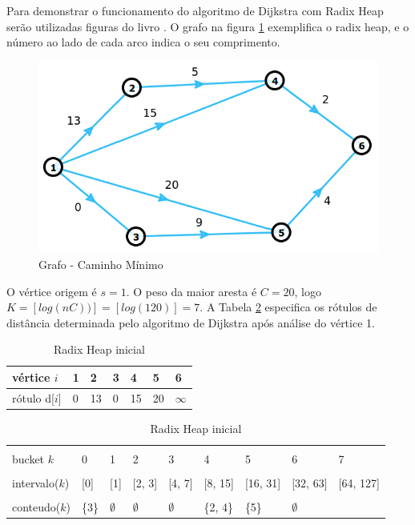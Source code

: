 Para demonstrar o funcionamento do algoritmo de Dijkstra com Radix Heap serão utilizadas figuras do livro \cite{bookahuja}.
O grafo na figura \ref{fig:grafoRadix} exemplifica o radix heap, e o número ao lado de cada arco indica o seu comprimento.
\FloatBarrier
\begin{figure}[htbp]
\centering
 \includegraphics[width=.65\textwidth]{figuras/grafoRadix.png}
\caption{Grafo - Caminho Mínimo}
\label{fig:grafoRadix}
\end{figure}
\FloatBarrier
O vértice origem é $s = 1$. O peso da maior aresta é $C = 20$, logo $K = [log(nC))] = [log(120)] = 7$.
A Tabela \ref{tab:initialradixheap} especifica os rótulos de distância determinada pelo algoritmo de Dijkstra
após análise do vértice 1.
\FloatBarrier
\begin{table}[htbp]
  \centering
  \begin{tabular}{l l l l l l l}
  \toprule
  vértice $i$ & 1 & 2 & 3 & 4 & 5 & 6\\
  \midrule
  rótulo d[$i$] & 0 & 13 & 0 & 15 & 20 & $\infty$ \\
  \bottomrule
  \end{tabular}
  
  \centering
  \begin{tabular}{l l l l l l l l l}
  \toprule
  \\bucket $k$ & 0 & 1 & 2 & 3 & 4 & 5 & 6 & 7\\
  \midrule
  \\intervalo($k$) & [0] & [1] & [2, 3] & [4, 7] & [8, 15] & [16, 31] & [32, 63] & [64, 127]\\
  \\conteudo($k$) & \{3\} & $\emptyset$ & $\emptyset$ & $\emptyset$ & \{2, 4\} & \{5\} & $\emptyset$ & \\
  \bottomrule
  \end{tabular}
\caption{Radix Heap inicial}
 \label{tab:initialradixheap}
\end{table}

